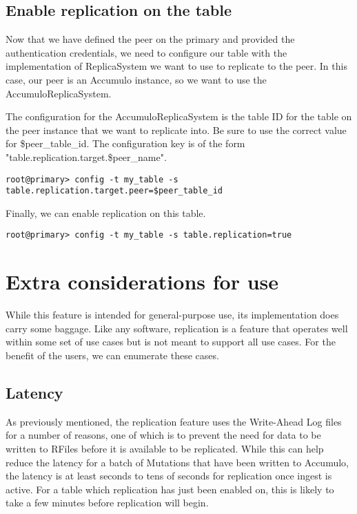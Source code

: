 \subsection{Enable replication on the table}

Now that we have defined the peer on the primary and provided the authentication credentials, we need to configure
our table with the implementation of ReplicaSystem we want to use to replicate to the peer. In this case, our peer 
is an Accumulo instance, so we want to use the AccumuloReplicaSystem.

The configuration for the AccumuloReplicaSystem is the table ID for the table on the peer instance that we
want to replicate into. Be sure to use the correct value for \$peer\_table\_id. The configuration key is of
the form "table.replication.target.\$peer\_name".

\begingroup\fontsize{8pt}{8pt}\selectfont\begin{verbatim}
root@primary> config -t my_table -s table.replication.target.peer=$peer_table_id
\end{verbatim}\endgroup

Finally, we can enable replication on this table.

\begingroup\fontsize{8pt}{8pt}\selectfont\begin{verbatim}
root@primary> config -t my_table -s table.replication=true
\end{verbatim}\endgroup

\section{Extra considerations for use}

While this feature is intended for general-purpose use, its implementation does carry some baggage. Like any software,
replication is a feature that operates well within some set of use cases but is not meant to support all use cases.
For the benefit of the users, we can enumerate these cases.

\subsection{Latency}

As previously mentioned, the replication feature uses the Write-Ahead Log files for a number of reasons, one of which
is to prevent the need for data to be written to RFiles before it is available to be replicated. While this can help
reduce the latency for a batch of Mutations that have been written to Accumulo, the latency is at least seconds to tens
of seconds for replication once ingest is active. For a table which replication has just been enabled on, this is likely
to take a few minutes before replication will begin.

